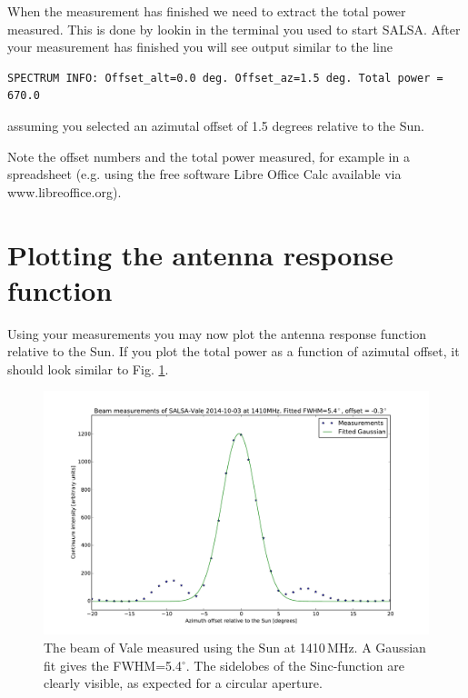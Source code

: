 When the measurement has finished we need to extract the total power measured.
This is done by lookin in the terminal you used to start SALSA. After your 
measurement has finished you will see output similar to the line 
\begin{verbatim}
SPECTRUM INFO: Offset_alt=0.0 deg. Offset_az=1.5 deg. Total power = 670.0
\end{verbatim}
assuming you selected an azimutal offset of 1.5 degrees relative to the Sun.

Note the offset numbers and the total power measured, for example 
in a spreadsheet (e.g. using the free software Libre Office Calc available 
via www.libreoffice.org).

\section{Plotting the antenna response function}
Using your measurements you may now plot the antenna response function
relative to the Sun. If you plot the total power as a function
of azimutal offset, it should look similar to Fig. \ref{fig:beam}.

\begin{figure}[ht]
\begin{center}
\includegraphics[width=\textwidth]{../figures/Beam_vale_2014-10-03.pdf}
\end{center}
\caption{The beam of Vale measured using the Sun at 1410\,MHz. A Gaussian fit
gives the FWHM=5.4$^\circ$. The sidelobes of the Sinc-function are clearly
visible, as expected for a circular aperture.}
\label{fig:beam}
\end{figure}

